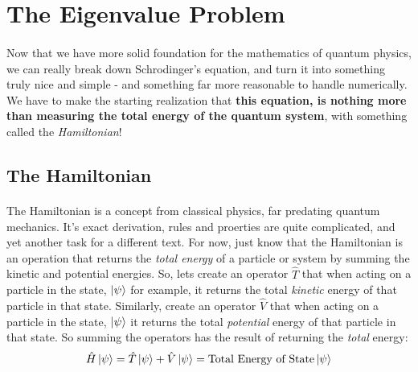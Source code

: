 \documentclass[12pt,letterpaper]{book}
\begin{document}
 

\section{The Eigenvalue Problem}
\paragraph*{}Now that we have more solid foundation for the mathematics of quantum physics, we can really break down Schrodinger's equation, and turn it into something truly nice and simple - and something far more reasonable to handle numerically. We have to make the starting realization that \textbf{this equation, is nothing more than measuring the total energy of the quantum system}, with something called the \textit{Hamiltonian}!


\subsection*{The Hamiltonian} 
\paragraph*{}The Hamiltonian is a concept from classical physics, far predating quantum mechanics. It's exact derivation, rules and proerties are quite complicated, and yet another task for a different text. For now, just know that the Hamiltonian is an operation that returns the \textit{total energy} of a particle or system by summing the kinetic and potential energies. So, lets create an operator $\hat{T}$ that when acting on a particle in the state, $\ket{\psi}$ for example, it returns the total \textit{kinetic} energy of that particle in that state. Similarly, create an operator $\hat{V}$ that when acting on a particle in the state, $\ket{\psi}$ it returns the total \textit{potential} energy of that particle in that state. So summing the operators has the result of returning the \textit{total} energy:
\begin{equation}
\label{Hamiltonian}
\hat{H}\ket{\psi} = \hat{T}\ket{\psi} + \hat{V}\ket{\psi} = \text{Total Energy of State}\ket{\psi}
\end{equation}
\end{document}

